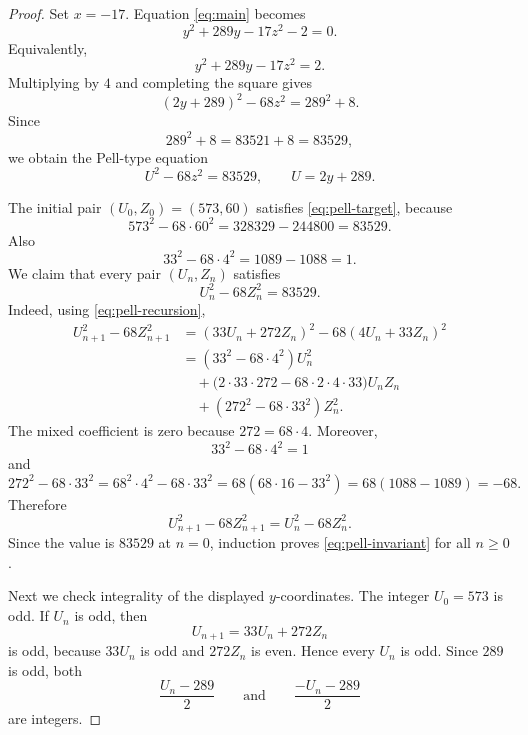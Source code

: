 \documentclass[11pt]{article}
\theoremstyle{remark}
\begin{document}
\begin{proof}
Set $x=-17$.  Equation \eqref{eq:main} becomes
\begin{equation}\label{eq:x-minus-17}
        y^2+289y-17z^2-2=0.
\end{equation}
Equivalently,
\begin{equation}\label{eq:x-minus-17-factor}
        y^2+289y-17z^2=2.
\end{equation}
Multiplying by $4$ and completing the square gives
\[
        (2y+289)^2-68z^2=289^2+8.
\]
Since
\[
        289^2+8=83521+8=83529,
\]
we obtain the Pell-type equation
\begin{equation}\label{eq:pell-target}
        U^2-68z^2=83529,
        \qquad U=2y+289.
\end{equation}

The initial pair $(U_0,Z_0)=(573,60)$ satisfies \eqref{eq:pell-target}, because
\[
        573^2-68\cdot 60^2
        =328329-244800
        =83529.
\]
Also
\[
        33^2-68\cdot 4^2=1089-1088=1.
\]
We claim that every pair $(U_n,Z_n)$ satisfies
\begin{equation}\label{eq:pell-invariant}
        U_n^2-68Z_n^2=83529.
\end{equation}
Indeed, using \eqref{eq:pell-recursion},
\[
\begin{aligned}
        U_{n+1}^2-68Z_{n+1}^2
        &=(33U_n+272Z_n)^2-68(4U_n+33Z_n)^2 \\
        &=(33^2-68\cdot 4^2)U_n^2 \\
        &\quad +\bigl(2\cdot 33\cdot 272-68\cdot 2\cdot 4\cdot 33\bigr)U_nZ_n \\
        &\quad +(272^2-68\cdot 33^2)Z_n^2.
\end{aligned}
\]
The mixed coefficient is zero because $272=68\cdot 4$.  Moreover,
\[
        33^2-68\cdot 4^2=1
\]
and
\[
        272^2-68\cdot 33^2
        =68^2\cdot 4^2-68\cdot 33^2
        =68(68\cdot 16-33^2)
        =68(1088-1089)
        =-68.
\]
Therefore
\[
        U_{n+1}^2-68Z_{n+1}^2=U_n^2-68Z_n^2.
\]
Since the value is $83529$ at $n=0$, induction proves \eqref{eq:pell-invariant} for all $n\ge 0$.

Next we check integrality of the displayed $y$-coordinates.  The integer $U_0=573$ is odd.  If $U_n$ is odd, then
\[
        U_{n+1}=33U_n+272Z_n
\]
is odd, because $33U_n$ is odd and $272Z_n$ is even.  Hence every $U_n$ is odd.  Since $289$ is odd, both
\[
        \frac{U_n-289}{2}
        \qquad\text{and}\qquad
        \frac{-U_n-289}{2}
\]
are integers.


\end{proof}
\end{document}
